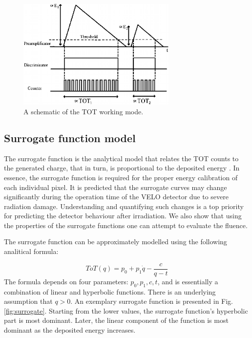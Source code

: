 \begin{figure}[H]
\centering
\includegraphics[width=0.7\textwidth]{figures/chapter4/surrogates/Schematic-of-the-time-over-threshold-working-mode.png}
\caption{A schematic of the TOT working mode.}
\label{fig:sur_tot}
\end{figure}

\subsection{Surrogate function model}
\label{surrogate_func}

The surrogate function is the analytical model that relates the TOT counts to the generated charge, that in turn, is proportional to the deposited energy \cite{Tsopelas:2016cjb}. In essence, the surrogate function is required for the proper energy calibration of each individual pixel. It is predicted that the surrogate curves may change significantly during the operation time of the VELO detector due to severe radiation damage. Understanding and quantifying such changes is a top priority for predicting the detector behaviour after irradiation.
We also show that using the properties of the surrogate functions one can attempt to evaluate the fluence.

The surrogate function can be approximately modelled using the following analitical formula:


\begin{equation}
  \label{eq:surrogate}
  ToT(q) = p_{0} + p_{1} \dot q - \frac{c}{q-t}
  \end{equation}
The formula depends on four parameters: $p_{0},p_{1},c,t$, and is essentially a combination of linear and hyperbolic functions. There is an underlying assumption that $q > 0$.
An exemplary surrogate function is presented in Fig. \ref{fig:surrogate}.
Starting from the lower values, the surrogate function's hyperbolic part is most dominant. Later, the linear component of the function is most dominant as the deposited energy increases.

